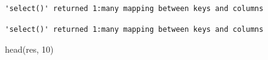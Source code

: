 \documentclass[
  letterpaper,
  DIV=11,
  numbers=noendperiod]{scrartcl}
\newenvironment{Shaded}{\begin{snugshade}}{\end{snugshade}}
\newcommand{\AttributeTok}[1]{\textcolor[rgb]{0.40,0.45,0.13}{#1}}
\newcommand{\DecValTok}[1]{\textcolor[rgb]{0.68,0.00,0.00}{#1}}
\newcommand{\FunctionTok}[1]{\textcolor[rgb]{0.28,0.35,0.67}{#1}}
\newcommand{\NormalTok}[1]{\textcolor[rgb]{0.00,0.23,0.31}{#1}}
\newcommand{\OtherTok}[1]{\textcolor[rgb]{0.00,0.23,0.31}{#1}}
\newcommand{\SpecialCharTok}[1]{\textcolor[rgb]{0.37,0.37,0.37}{#1}}
\newcommand{\StringTok}[1]{\textcolor[rgb]{0.13,0.47,0.30}{#1}}
\begin{document}
\begin{verbatim}
'select()' returned 1:many mapping between keys and columns
\end{verbatim}

\begin{Shaded}
\end{Shaded}

\begin{verbatim}
'select()' returned 1:many mapping between keys and columns
\end{verbatim}

\begin{Shaded}
\begin{Highlighting}[]
\FunctionTok{head}\NormalTok{(res, }\DecValTok{10}\NormalTok{)}
\end{Highlighting}
\end{Shaded}
\end{document}
